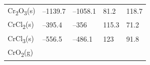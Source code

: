 \documentclass[
]{book}
\theoremstyle{definition}
\theoremstyle{definition}
\theoremstyle{definition}
\theoremstyle{remark}
\begin{document}
\begin{longtable}[]{@{}lllll@{}}
\begin{minipage}[t]{0.10\columnwidth}
Cr\textsubscript{2}O\textsubscript{3}(s)\strut
\end{minipage} & \begin{minipage}[t]{0.19\columnwidth}\raggedright
--1139.7\strut
\end{minipage} & \begin{minipage}[t]{0.20\columnwidth}\raggedright
--1058.1\strut
\end{minipage} & \begin{minipage}[t]{0.18\columnwidth}\raggedright
81.2\strut
\end{minipage} & \begin{minipage}[t]{0.18\columnwidth}\raggedright
118.7\strut
\end{minipage}\tabularnewline
\begin{minipage}[t]{0.10\columnwidth}\raggedright
CrCl\textsubscript{2}(s)\strut
\end{minipage} & \begin{minipage}[t]{0.19\columnwidth}\raggedright
--395.4\strut
\end{minipage} & \begin{minipage}[t]{0.20\columnwidth}\raggedright
--356\strut
\end{minipage} & \begin{minipage}[t]{0.18\columnwidth}\raggedright
115.3\strut
\end{minipage} & \begin{minipage}[t]{0.18\columnwidth}\raggedright
71.2\strut
\end{minipage}\tabularnewline
\begin{minipage}[t]{0.10\columnwidth}\raggedright
CrCl\textsubscript{3}(s)\strut
\end{minipage} & \begin{minipage}[t]{0.19\columnwidth}\raggedright
--556.5\strut
\end{minipage} & \begin{minipage}[t]{0.20\columnwidth}\raggedright
--486.1\strut
\end{minipage} & \begin{minipage}[t]{0.18\columnwidth}\raggedright
123\strut
\end{minipage} & \begin{minipage}[t]{0.18\columnwidth}\raggedright
91.8\strut
\end{minipage}\tabularnewline
\begin{minipage}[t]{0.10\columnwidth}\raggedright
CrO\textsubscript{2}(g)\strut
\end{minipage} & \begin{minipage}[t]{0.19\columnwidth}\raggedright

\end{minipage}
\end{longtable}
\end{document}
